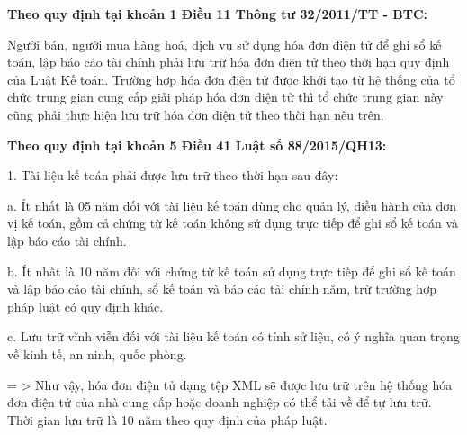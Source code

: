 \textbf{Theo quy định tại khoản 1 Điều 11 Thông tư 32/2011/TT - BTC:}

Người bán, người mua hàng hoá, dịch vụ sử dụng hóa đơn điện tử để ghi sổ kế toán, lập báo cáo tài chính phải lưu trữ hóa đơn điện tử theo thời hạn quy định của Luật Kế toán. Trường hợp hóa đơn điện tử được khởi tạo từ hệ thống của tổ chức trung gian cung cấp giải pháp hóa đơn điện tử thì tổ chức trung gian này cũng phải thực hiện lưu trữ hóa đơn điện tử theo thời hạn nêu trên.

\textbf{Theo quy định tại khoản 5 Điều 41 Luật số 88/2015/QH13:}

1. Tài liệu kế toán phải được lưu trữ theo thời hạn sau đây:

a. Ít nhất là 05 năm đối với tài liệu kế toán dùng cho quản lý, điều hành của đơn vị kế toán, gồm cả chứng từ kế toán không sử dụng trực tiếp để ghi sổ kế toán và lập báo cáo tài chính.

b. Ít nhất là 10 năm đối với chứng từ kế toán sử dụng trực tiếp để ghi sổ kế toán và lập báo cáo tài chính, sổ kế toán và báo cáo tài chính năm, trừ trường hợp pháp luật có quy định khác.

c. Lưu trữ vĩnh viễn đối với tài liệu kế toán có tính sử liệu, có ý nghĩa quan trọng về kinh tế, an ninh, quốc phòng.

= > Như vậy, hóa đơn điện tử dạng tệp XML sẽ được lưu trữ trên hệ thống hóa đơn điện tử của nhà cung cấp hoặc doanh nghiệp có thể tải về để tự lưu trữ. Thời gian lưu trữ là 10 năm theo quy định của pháp luật.

